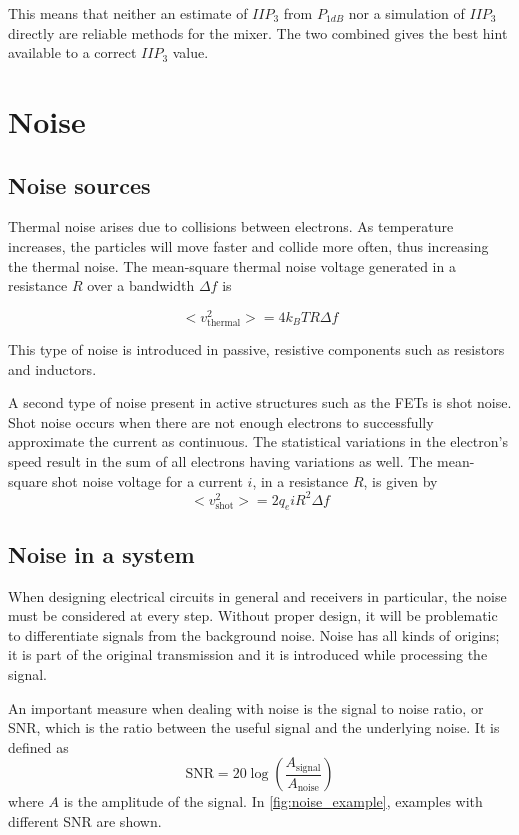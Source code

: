 			This means that neither an estimate of $IIP_3$ from $P_{1dB}$ nor a simulation of $IIP_3$ directly are reliable methods for the mixer. The two combined gives the best hint available to a correct $IIP_3$ value.

	\section{Noise}
		\subsection{Noise sources}\label{sec:noise_thermal}
			Thermal noise arises due to collisions between electrons. As temperature increases, the particles will move faster and collide more often, thus increasing the thermal noise. The mean-square thermal noise voltage generated in a resistance $R$ over a bandwidth $\Delta f$ is\autocite{bahl03}

			\begin{equation}
				< v^2_\text{thermal} > = 4k_BTR\Delta f
			\end{equation}

			This type of noise is introduced in passive, resistive components such as resistors and inductors.

			A second type of noise present in active structures such as the FETs is shot noise. Shot noise occurs when there are not enough electrons to successfully approximate the current as continuous. The statistical variations in the electron's speed result in the sum of all electrons having variations as well. The mean-square shot noise voltage for a current $i$, in a resistance $R$, is given by
			\begin{equation}
				< v^2_\text{shot} > = 2q_eiR^2\Delta f
			\end{equation}

		\subsection{Noise in a system}
			When designing electrical circuits in general and receivers in particular, the noise must be considered at every step. Without proper design, it will be problematic to differentiate signals from the background noise. Noise has all kinds of origins; it is part of the original transmission and it is introduced while processing the signal.

			An important measure when dealing with noise is the signal to noise ratio, or SNR, which is the ratio between the useful signal and the underlying noise. It is defined as
			\begin{equation}
					\text{SNR}=20\log \left(\frac{ A_\text{signal} }{ A_\text{noise} }\right)
			\end{equation}
			where $A$ is the amplitude of the signal. In \autoref{fig:noise_example}, examples with different SNR are shown.

